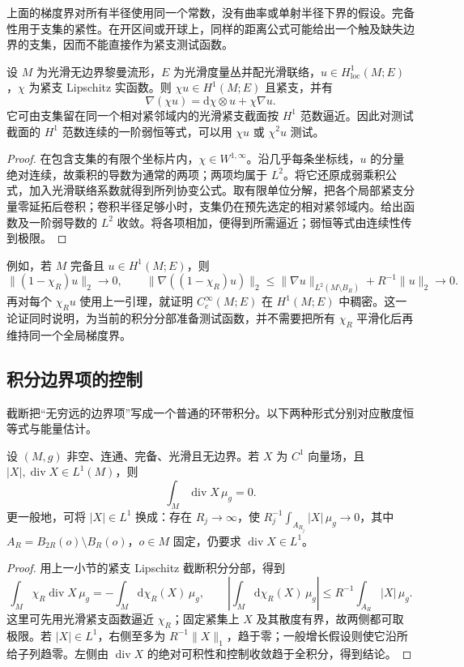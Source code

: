 上面的梯度界对所有半径使用同一个常数，没有曲率或单射半径下界的假设。完备性用于支集的紧性。在开区间或开球上，同样的距离公式可能给出一个触及缺失边界的支集，因而不能直接作为紧支测试函数。

\begin{lemma}\label{g3:lem:lipschitz-cutoff-testing}
	设 \(M\) 为光滑无边界黎曼流形，\(E\) 为光滑度量丛并配光滑联络，\(u\in H^1_{\mathrm{loc}}(M;E)\)，\(\chi\) 为紧支 Lipschitz 实函数。则 \(\chi u\in H^1(M;E)\) 且紧支，并有
	\[
		\nabla(\chi u)=\mathrm d\chi\otimes u+\chi\nabla u.
	\]
	它可由支集留在同一个相对紧邻域内的光滑紧支截面按 \(H^1\) 范数逼近。因此对测试截面的 \(H^1\) 范数连续的一阶弱恒等式，可以用 \(\chi u\) 或 \(\chi^2u\) 测试。
\end{lemma}
\begin{proof}
	在包含支集的有限个坐标片内，\(\chi\in W^{1,\infty}\)。沿几乎每条坐标线，\(u\) 的分量绝对连续，故乘积的导数为通常的两项；两项均属于 \(L^2\)。将它还原成弱乘积公式，加入光滑联络系数就得到所列协变公式。取有限单位分解，把各个局部紧支分量零延拓后卷积；卷积半径足够小时，支集仍在预先选定的相对紧邻域内。给出函数及一阶弱导数的 \(L^2\) 收敛。将各项相加，便得到所需逼近；弱恒等式由连续性传到极限。
\end{proof}

例如，若 \(M\) 完备且 \(u\in H^1(M;E)\)，则
\[
	\|(1-\chi_R)u\|_2\longrightarrow0,\qquad
	\|\nabla((1-\chi_R)u)\|_2
	\le\|\nabla u\|_{L^2(M\setminus B_R)}+R^{-1}\|u\|_2
	\longrightarrow0.
\]
再对每个 \(\chi_Ru\) 使用上一引理，就证明 \(C_c^\infty(M;E)\) 在 \(H^1(M;E)\) 中稠密。这一论证同时说明，为当前的积分分部准备测试函数，并不需要把所有 \(\chi_R\) 平滑化后再维持同一个全局梯度界。

\subsection{积分边界项的控制}
\label{g3:subsec:1504:02}
截断把“无穷远的边界项”写成一个普通的环带积分。以下两种形式分别对应散度恒等式与能量估计。

\begin{proposition}\label{g3:prop:complete-integrable-divergence}
	设 \((M,g)\) 非空、连通、完备、光滑且无边界。若 \(X\) 为 \(C^1\) 向量场，且 \(|X|,\operatorname{div}X\in L^1(M)\)，则
	\[
		\int_M\operatorname{div}X\,\mu_g=0.
	\]
	更一般地，可将 \(|X|\in L^1\) 换成：存在 \(R_j\to\infty\)，使
	\(R_j^{-1}\int_{A_{R_j}}|X|\,\mu_g\to0\)，其中 \(A_R=B_{2R}(o)\setminus B_R(o)\)，\(o\in M\) 固定，仍要求 \(\operatorname{div}X\in L^1\)。
\end{proposition}
\begin{proof}
	用上一小节的紧支 Lipschitz 截断积分分部，得到
	\[
		\int_M\chi_R\operatorname{div}X\,\mu_g
		=-\int_M\mathrm d\chi_R(X)\,\mu_g,
		\qquad
		\left|\int_M\mathrm d\chi_R(X)\,\mu_g\right|
		\le R^{-1}\int_{A_R}|X|\,\mu_g.
	\]
	这里可先用光滑紧支函数逼近 \(\chi_R\)；固定紧集上 \(X\) 及其散度有界，故两侧都可取极限。若 \(|X|\in L^1\)，右侧至多为 \(R^{-1}\|X\|_1\)，趋于零；一般增长假设则使它沿所给子列趋零。左侧由 \(\operatorname{div}X\) 的绝对可积性和控制收敛趋于全积分，得到结论。
\end{proof}

